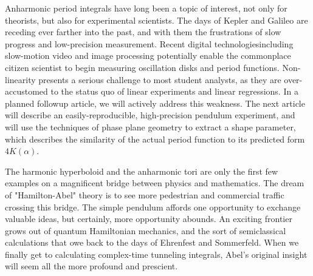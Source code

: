 \documentclass[nofootinbib,preprint]{revtex4-1}
\begin{document}
Anharmonic period integrals have long been a topic of interest, not only for theorists, but also for 
experimental scientists. The days of Kepler and Galileo are receding ever farther into the past, and 
with them the frustrations of slow progress and low-precision measurement. Recent digital 
technologies\textemdash including slow-motion video and image processing\textemdash 
potentially enable the commonplace citizen scientist to begin measuring oscillation disks and 
period functions. Non-linearity presents a serious challenge to most student analysts, as they
are over-accustomed to the status quo of linear experiments and linear regressions. In a planned 
followup article, we will actively address this weakness. The next article will describe an 
easily-reproducible, high-precision pendulum experiment, and will use the techniques of phase 
plane geometry to extract a shape parameter, which describes the similarity of the actual period 
function to its predicted form $4K(\alpha)$.
 
The harmonic hyperboloid and the anharmonic tori are only the first few examples on a magnificent 
bridge between physics and mathematics. The dream of "Hamilton-Abel" theory is to see more pedestrian 
and commercial traffic crossing this bridge. The simple pendulum affords one opportunity to exchange 
valuable ideas, but certainly, more opportunity abounds. An exciting frontier grows out of quantum 
Hamiltonian mechanics, and the sort of semiclassical calculations that owe back to the days of 
Ehrenfest and Sommerfeld.  When we finally get to calculating complex-time tunneling integrals, 
Abel's original insight will seem all the more profound and prescient. \pagebreak




\end{document}
